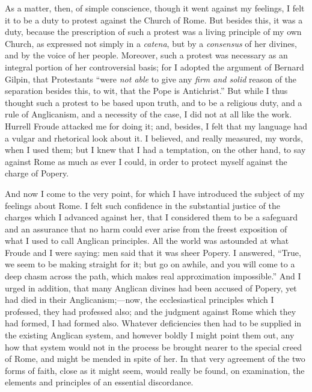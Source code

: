 As a matter, then, of simple conscience, though it went against my
feelings, I felt it to be a duty to protest against the Church of Rome.
But besides this, it was a duty, because the prescription of such a
protest was a living principle of my own Church, as expressed not
simply in a \emph{catena}, but by a \emph{consensus} of
her divines, and by the voice of her people. Moreover, such a
protest was necessary as an integral portion of her controversial basis;
for I adopted the argument of Bernard Gilpin, that Protestants
``were \emph{not able} to give any \emph{firm and solid} reason of
the separation besides this, to wit, that the Pope is Antichrist.''
But while I thus thought such a protest to be based upon truth, and to
be a religious duty, and a rule of Anglicanism, and a necessity of the
case, I did not at all like the work. Hurrell Froude attacked me for
doing it; and, besides, I felt that my language had a vulgar and
rhetorical look about it. I believed, and really measured, my words,
when I used them; but I knew that I had a temptation, on the other hand,
to say against Rome as much as ever I could, in order to protect myself
against the charge of Popery.

And now I come to the very point, for which I have introduced the
subject of my feelings about Rome. I felt such confidence in the
substantial justice of the charges which I advanced against her, that I
considered them to be a safeguard and an assurance that no harm could
ever arise from the freest exposition of what I used to call Anglican
principles. All the world was astounded at what Froude and I were
saying: men said that it was sheer Popery. I answered, ``True, we
seem to be making straight for it; but go on awhile, and you will come
to a deep chasm across the path, which makes real approximation
impossible.'' And I urged in addition, that many Anglican divines
had been accused of Popery, yet had died in their Anglicanism;—now,
the ecclesiastical principles which I professed, they had professed
also; and the judgment against Rome which they had formed, I had formed
also. Whatever deficiencies then had to be supplied in the existing Anglican system, and however boldly I
might point them out, any how that system would not in
the process be brought nearer to the special creed of Rome, and might be
mended in spite of her. In that very agreement of
the two forms of faith, close as it might seem, would really be found,
on examination, the elements and principles of an essential discordance.

